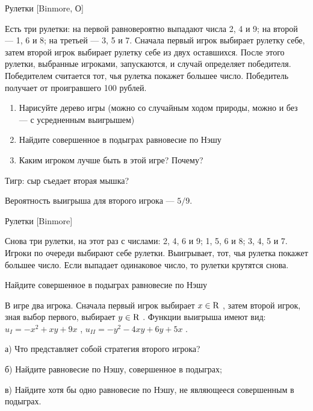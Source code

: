 \begin{problem}
 Рулетки [Binmore, О]\par
Есть три рулетки: на первой равновероятно выпадают числа 2, 4 и 9; на второй — 1, 6 и 8; на третьей — 3, 5 и 7. Сначала первый игрок выбирает рулетку себе, затем второй игрок выбирает рулетку себе из двух оставшихся. После этого рулетки, выбранные игроками, запускаются, и случай определяет победителя. Победителем считается тот, чья рулетка покажет большее число. Победитель получает от проигравшего 100 рублей.\par
\begin{enumerate}
\item Нарисуйте дерево игры (можно со случайным ходом природы, можно и без — с усредненным выигрышем)
\item Найдите совершенное в подыграх равновесие по Нэшу
\item Каким игроком лучше быть в этой игре? Почему?
\end{enumerate}
Тигр: сыр съедает вторая мышка?



\begin{sol}
Вероятность выигрыша для второго игрока — $5/9$.
\end{sol}
\end{problem}



\begin{problem}
 Рулетки [Binmore]\par
Снова три рулетки, на этот раз с числами: 2, 4, 6 и 9; 1, 5, 6 и 8; 3, 4, 5 и 7. Игроки по очереди выбирают себе рулетки. Выигрывает, тот, чья рулетка покажет большее число. Если выпадает одинаковое число, то рулетки крутятся снова.\par
Найдите совершенное в подыграх равновесие по Нэшу



\begin{sol}

\end{sol}
\end{problem}



\begin{problem}

В игре два игрока. Сначала первый игрок выбирает  $x\in {\rm R} $ , затем второй игрок, зная выбор первого, выбирает  $y\in {\rm R} $ .
Функции выигрыша имеют вид:  $u_{I} =-x^{2} +xy+9x$ ,  $u_{II} =-y^{2} -4xy+6y+5x$ .\par
а) Что представляет собой стратегия второго игрока?\par
б) Найдите равновесие по Нэшу, совершенное в подыграх;\par
в) Найдите хотя бы одно равновесие по Нэшу, не являющееся совершенным в подыграх.\par



\begin{sol}

\end{sol}
\end{problem}



